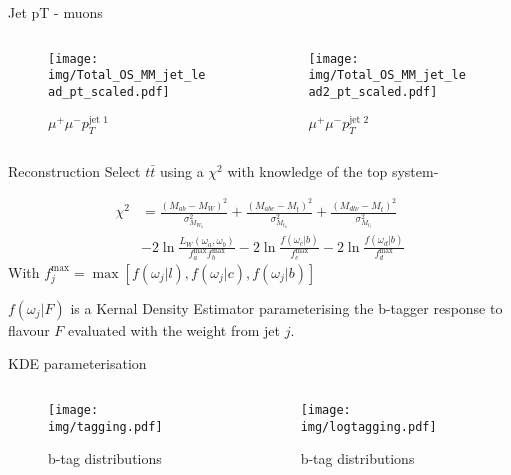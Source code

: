 \documentclass{beamer}
\begin{document}
\begin{frame}{Jet pT - muons}
  \begin{columns}
    \begin{column}{0.45\textwidth}\begin{figure}
      \caption{$\mu^{+}\mu^{-}p_{T}^{\text{jet 1}}$}
      \texttt{[image: img/Total\_OS\_MM\_jet\_lead\_pt\_scaled.pdf]}
    \end{figure}\end{column}
    \begin{column}{0.45\textwidth}\begin{figure}
      \caption{$\mu^{+}\mu^{-}p_{T}^{\text{jet 2}}$}
      \texttt{[image: img/Total\_OS\_MM\_jet\_lead2\_pt\_scaled.pdf]}
    \end{figure}\end{column}
  \end{columns}
\end{frame}

\begin{frame}{Reconstruction}
Select $t\bar{t}$ using a $\chi^2$ with knowledge of the top system-

\begin{equation}\begin{split}
  \chi^2 &= \frac{\left(M_{ab} - M_W\right)^2}{\sigma^2_{M_{W_h}}} + \frac{\left(M_{abc} - M_t\right)^2}{\sigma^2_{M_{t_h}}} + \frac{\left(M_{dl\nu} - M_t\right)^2}{\sigma^2_{M_{t_l}}} \\
  &-2\ln{\frac{L_{W}\left( \omega_{a},\omega_{b} \right)}{f^{\text{max}}_{a} f^{\text{max}}_{b}}} -2\ln{\frac{f\left(\omega_{c} \big| b\right)}{f^{\text{max}}_{c}}} -2\ln{\frac{f\left(\omega_{d} \big| b\right)}{f^{\text{max}}_{d}}}
\end{split}\end{equation}
With $f^{\text{max}}_j = \max\left[f\left(\omega_{j} \big| l\right), f\left(\omega_{j} \big| c\right), f\left(\omega_{j} \big| b\right)\right]$

$f\left( \omega_{j} \big| F\right)$ is a Kernal Density Estimator parameterising the b-tagger response to flavour $F$ evaluated with the weight from jet $j$.
\end{frame}

\begin{frame}{KDE parameterisation}
  \begin{columns}
    \begin{column}{0.45\textwidth}\begin{figure}
      \caption{b-tag distributions}
      \texttt{[image: img/tagging.pdf]}
    \end{figure}\end{column}
    \begin{column}{0.45\textwidth}\begin{figure}
      \caption{b-tag distributions}
      \texttt{[image: img/logtagging.pdf]}
    \end{figure}\end{column}
  \end{columns}
\end{frame}
\end{document}
